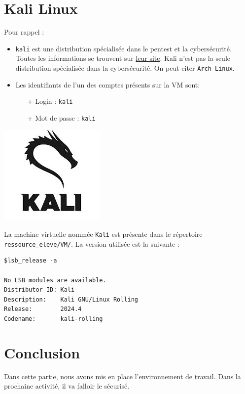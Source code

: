 \documentclass[french, 12pt]{article}%
\newcommand{\itemE}{\item[$\bullet$]}
\begin{document}
\section{Kali Linux}
\begin{minipage}{0.6\linewidth}
Pour rappel : 
\begin{itemize}
\itemE \verb?kali? est une distribution spécialisée dans le pentest et la cybersécurité. Toutes les informations se trouvent sur  \href{https://www.kali.org/}{leur site}. Kali n'est pas la seule distribution spécialisée dans la cybersécurité. On peut citer \verb?Arch Linux?.
\itemE Les identifiants de l'un des comptes présents sur la VM sont: 
	\begin{itemize}
	\item[+] Login : \verb?kali?
	\item[+] Mot de passe : \verb?kali?
\end{itemize}	 
\end{itemize}
\end{minipage}
\begin{minipage}{0.4\linewidth}
\begin{center}
\includegraphics[scale=0.4]{./ressource/logoKali}
\end{center}
\end{minipage}

La machine virtuelle nommée \verb?Kali? est présente dans le répertoire \verb?ressource_eleve/VM/?. La version utilisée est la suivante :


\begin{lstlisting}[style=commande]
$lsb_release -a

No LSB modules are available.
Distributor ID: Kali
Description:    Kali GNU/Linux Rolling
Release:        2024.4
Codename:       kali-rolling
\end{lstlisting}
\section{Conclusion}

Dans cette partie, nous avons mis en place l'environnement de travail. Dans la prochaine activité, il va falloir le sécurisé.
\end{document}

